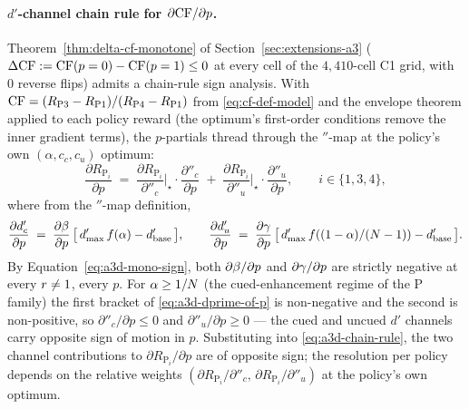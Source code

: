 \paragraph{$d'$-channel chain rule for $\partial \mathrm{CF}/\partial p$.}
Theorem~\ref{thm:delta-cf-monotone} of
Section~\ref{sec:extensions-a3}
($\Delta\mathrm{CF} := \mathrm{CF}(p = 0) - \mathrm{CF}(p = 1) \le 0$ at every cell of
the $4{,}410$-cell C1 grid, with $0$ reverse flips) admits a
chain-rule sign analysis. With
$\mathrm{CF} = (R_{\mathrm{P3}} - R_{\mathrm{P1}})/(R_{\mathrm{P4}} - R_{\mathrm{P1}})$ from
\eqref{eq:cf-def-model} and the envelope theorem applied to each
policy reward (the optimum's first-order conditions remove the
inner gradient terms), the $p$-partials thread through the
$\dprime$-map at the policy's own
$(\alpha, c_c, c_u)$ optimum:
\begin{equation}
  \frac{\partial R_{\mathrm{P}_i}}{\partial p}
  \;=\;
  \frac{\partial R_{\mathrm{P}_i}}{\partial \dprime_c}\!\bigg|_{\!\star}
  \cdot
  \frac{\partial \dprime_c}{\partial p}
  \;+\;
  \frac{\partial R_{\mathrm{P}_i}}{\partial \dprime_u}\!\bigg|_{\!\star}
  \cdot
  \frac{\partial \dprime_u}{\partial p},
  \qquad
  i \in \{1, 3, 4\},
  \label{eq:a3d-chain-rule}
\end{equation}
where from the $\dprime$-map definition,
\begin{equation}
  \frac{\partial d'_c}{\partial p}
  \;=\;
  \frac{\partial \beta}{\partial p}
  \,\bigl[\,d'_{\max}\,f(\alpha) - d'_{\mathrm{base}}\,\bigr],
  \qquad
  \frac{\partial d'_u}{\partial p}
  \;=\;
  \frac{\partial \gamma}{\partial p}
  \,\bigl[\,d'_{\max}\,f((1-\alpha)/(N-1))
           - d'_{\mathrm{base}}\,\bigr].
  \label{eq:a3d-dprime-of-p}
\end{equation}
By Equation~\eqref{eq:a3d-mono-sign}, both
$\partial \beta/\partial p$ and $\partial \gamma/\partial p$ are
strictly negative at every $r \ne 1$, every $p$. For
$\alpha \ge 1/N$ (the cued-enhancement regime of the
$\textrm{P}$ family) the first bracket of
\eqref{eq:a3d-dprime-of-p} is non-negative and the second is
non-positive, so $\partial \dprime_c/\partial p \le 0$ and
$\partial \dprime_u/\partial p \ge 0$ — the cued and uncued $d'$
channels carry opposite sign of motion in $p$. Substituting into
\eqref{eq:a3d-chain-rule}, the two channel contributions to
$\partial R_{\mathrm{P}_i}/\partial p$ are of opposite sign; the resolution per
policy depends on the relative weights
$(\partial R_{\mathrm{P}_i}/\partial \dprime_c,\, \partial R_{\mathrm{P}_i}/\partial
\dprime_u)$ at the policy's own optimum.

